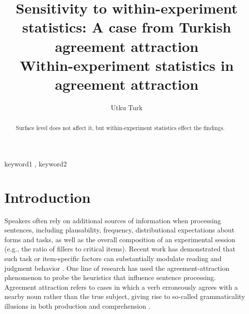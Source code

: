 \documentclass[
  authoryear,
  preprint]{elsarticle}
\begin{document}
\begin{frontmatter}
\title{Sensitivity to within-experiment statistics: A case from Turkish
agreement attraction \\\large{Within-experiment statistics in agreement
attraction} }
\author[1]{Utku Turk%
%
}



        
\begin{abstract}
Surface level does not affect it, but within-experiment statistics
effect the findings.
\end{abstract}





\begin{keyword}
    keyword1 \sep 
    keyword2
\end{keyword}
\end{frontmatter}
    

\section{Introduction}\label{introduction}

Speakers often rely on additional sources of information when processing
sentences, including plausability, frequency, distributional
expectations about forms and tasks, as well as the overall composition
of an experimental session (e.g., the ratio of fillers to critical
items). Recent work has demonstrated that such task or item-specific
factors can substantially modulate reading and judgment behavior
\citep{LauraMalsbug24, ArehalliWittenberg2021, HammerlyEtAl2019, LogacevVasishth2016}.
One line of research has used the agreement-attraction phenomenon to
probe the heuristics that influence sentence processing. Agreement
attraction refers to cases in which a verb erroneously agrees with a
nearby noun rather than the true subject, giving rise to so-called
grammaticality illusions in both production and comprehension
\citep{BockMiller:1991, PearlmutterGarnseyBock:1999}.

\begin{exe}
\end{exe}
\end{document}
